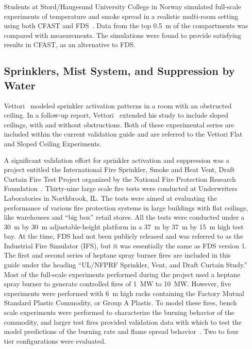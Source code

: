 Students at Stord/Haugesund University College in Norway simulated full-scale experiments of temperature and smoke spread in a
realistic multi-room setting using both CFAST and FDS~\cite{Storm:thesis}. Data from the top 0.5~m of the compartments was compared with measurements.
The simulations were found to provide satisfying results in CFAST, as an alternative to FDS.





\subsection{Sprinklers, Mist System, and Suppression by Water}

Vettori~\cite{Vettori:1} modeled sprinkler activation patterns in a room with an obstructed ceiling. In a follow-up report, Vettori~\cite{Vettori:2} extended his study to include sloped ceilings, with and without obstructions. Both of these experimental series are included within the current validation guide and are referred to the Vettori Flat and Sloped Ceiling Experiments.

A  significant validation effort  for sprinkler  activation and suppression was a project entitled the International Fire Sprinkler, Smoke and Heat Vent, Draft Curtain Fire Test Project organized by the National Fire Protection  Research Foundation~\cite{McGrattan:5}. Thirty-nine large scale fire tests were conducted at Underwriters Laboratories in Northbrook, IL. The tests were aimed at evaluating the performance of various fire protection systems in large buildings with flat ceilings, like warehouses and ``big box'' retail stores. All the tests were conducted under a 30~m by 30~m adjustable-height platform in a 37~m by 37~m by 15~m high test bay. At the time, FDS had not been publicly released and was referred to as the Industrial Fire Simulator (IFS), but it was essentially the same as FDS version 1. The first and second series of heptane spray burner fires are included in this guide under the heading ``UL/NFPRF Sprinkler, Vent, and Draft Curtain Study.'' Most of the full-scale experiments performed during the project used a heptane spray burner to  generate controlled fires of 1~MW to 10~MW. However, five experiments were performed with 6~m high racks containing the Factory Mutual Standard Plastic Commodity, or Group A Plastic. To model these fires, bench scale experiments were performed to characterize the burning behavior of the commodity, and larger test fires provided validation data with which to test the model predictions of the burning rate and flame spread behavior~\cite{Hamins:1,Hamins:IAFSS2002}. Two to four tier configurations were evaluated.

